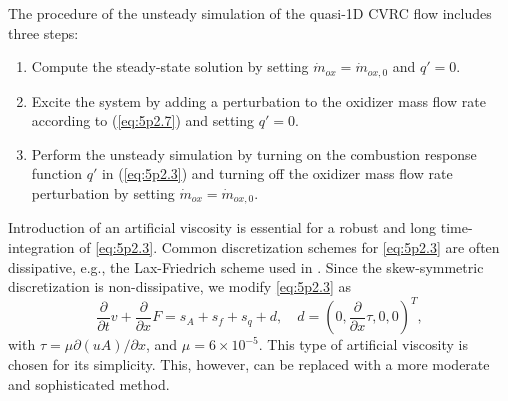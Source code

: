The procedure of the unsteady simulation of the quasi-1D CVRC flow includes three steps:
\begin{enumerate}
	\item  Compute the steady-state solution by setting $\dot{m}_{ox}=\dot{m}_{ox,0} $ and $q'=0$.
	\item  Excite the system by adding a perturbation to the oxidizer mass flow rate according to (\ref{eq:5p2.7}) and setting $q'=0$.
	\item  Perform the unsteady simulation by turning on the combustion response function $q'$ in (\ref{eq:5p2.3}) and turning off the oxidizer mass flow rate perturbation by setting $\dot{m}_{ox}=\dot{m}_{ox,0} $.	
\end{enumerate}
Introduction of an artificial viscosity is essential for a robust and long time-integration of \eqref{eq:5p2.3}. Common discretization schemes for \eqref{eq:5p2.3} are often dissipative, e.g., the Lax-Friedrich scheme used in \cite{Wang:255719}. Since the skew-symmetric discretization is non-dissipative, we modify \eqref{eq:5p2.3} as
\begin{equation} \label{eq:5p2.10} 
	\frac{\partial }{\partial t} v + \frac{\partial }{\partial x} F = s_A + s_f + s_q + d, \quad d = (0,\frac{\partial }{\partial x} \tau,0,0)^T,
\end{equation}
with $\tau = \mu \partial (u A)/ \partial x$, and $\mu = 6\times 10^{-5}$. This type of artificial viscosity is chosen for its simplicity. This, however, can be replaced with a more moderate and sophisticated method. 

